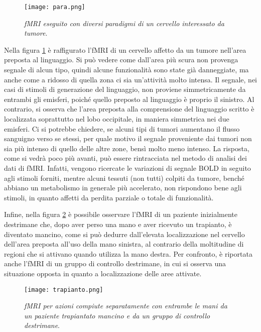 \documentclass{report}
\newcommand{\figref}[1]{figura \ref{#1}}
\numberwithin{equation}{section}
\numberwithin{figure}{section}
\begin{document}
\begin{figure}[htp]
\centering
\texttt{[image: para.png]}
\caption{\label{fig:para} \textit{fMRI eseguito con diversi paradigmi di un cervello interessato da tumore}.}
\end{figure}

Nella \figref{fig:para} è raffigurato l'fMRI di un cervello affetto da un tumore nell'area preposta al linguaggio. Si può vedere come dall'area più scura non provenga segnale di alcun tipo, quindi alcune funzionalità sono state già danneggiate, ma anche come a ridosso di quella zona ci sia un'attività molto intensa. Il segnale, nei casi di stimoli di generazione del linguaggio, non proviene simmetricamente da entrambi gli emisferi, poiché quello preposto al linguaggio è proprio il sinistro. Al contrario, si osserva che l'area preposta alla comprensione del linguaggio scritto è localizzata soprattutto nel lobo occipitale, in maniera simmetrica nei due emisferi. Ci si potrebbe chiedere, se alcuni tipi di tumori aumentano il flusso sanguigno verso se stessi, per quale motivo il segnale proveniente dai tumori non sia più intenso di quello delle altre zone, bensì molto meno intenso. La risposta, come si vedrà poco più avanti, può essere rintracciata nel metodo di analisi dei dati di fMRI. Infatti, vengono ricercate le variazioni di segnale BOLD in seguito agli stimoli forniti, mentre alcuni tessuti (non tutti) colpiti da tumore, benché abbiano un metabolismo in generale più accelerato, non rispondono bene agli stimoli, in quanto affetti da perdita parziale o totale di funzionalità.

Infine, nella \figref{fig:trapianto} è possibile osservare l'fMRI di un paziente inizialmente destrimane che, dopo aver perso una mano e aver ricevuto un trapianto, è diventato mancino, come si può dedurre dall'elevata localizzazione nel cervello dell'area preposta all'uso della mano sinistra, al contrario della moltitudine di regioni che si attivano quando utilizza la mano destra. Per confronto, è riportata anche l'fMRI di un gruppo di controllo destrimane, in cui si osserva una situazione opposta in quanto a localizzazione delle aree attivate.

\begin{figure}[htp]
\centering
\texttt{[image: trapianto.png]}
\caption{\label{fig:trapianto} \textit{fMRI per azioni compiute separatamente con entrambe le mani da un paziente trapiantato mancino e da un gruppo di controllo destrimane}.}
\end{figure}
\end{document}
